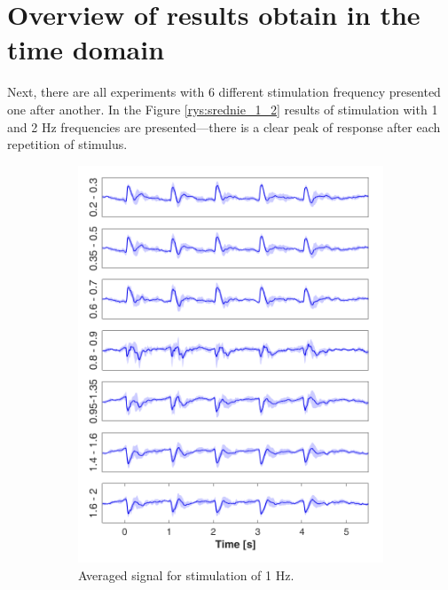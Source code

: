 \documentclass{pracalicmgr}
\begin{document}
    \section{Overview of results obtain in the time domain}
    Next, there are all experiments with 6 different stimulation frequency presented one after another. In the Figure \ref{rys:srednie_1_2} results of stimulation with 1 and 2 Hz frequencies are presented---there is a clear peak of response after each repetition of stimulus.
    
    \begin{figure}[H]
    \begin{subfigure}{.5\textwidth}
	\centering
		\includegraphics[width=1.\linewidth]{srednie_1Hz_5s.png}
		\caption{Averaged signal for stimulation of 1 Hz.}
		\label{rys:srednie_1Hz}
	\end{subfigure}
	\begin{subfigure}{.5\textwidth}
			\centering

\end{subfigure}
\end{figure}
\end{document}
